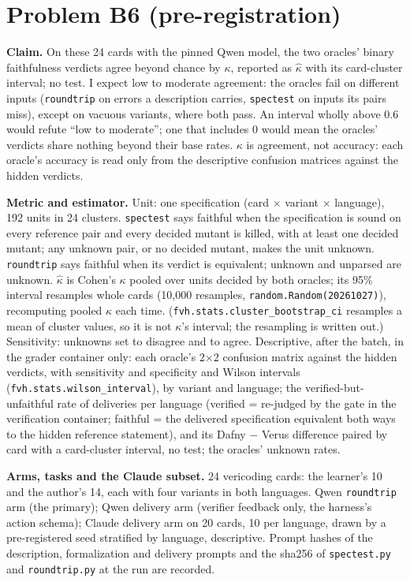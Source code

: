 \documentclass[11pt]{article}
\begin{document}
\section*{Problem B6 (pre-registration)}\label{ans:B6}
\begin{answer}
\textbf{Claim.} On these 24 cards with the pinned Qwen model, the two oracles'
binary faithfulness verdicts agree beyond chance by $\kappa$, reported as
$\hat\kappa$ with its card-cluster interval; no test. I expect low to moderate
agreement: the oracles fail on different inputs (\texttt{roundtrip} on errors a
description carries, \texttt{spectest} on inputs its pairs miss), except on
vacuous variants, where both pass. An interval wholly above 0.6 would refute
``low to moderate''; one that includes 0 would mean the oracles' verdicts
share nothing beyond their base rates. $\kappa$ is agreement, not accuracy:
each oracle's accuracy is read only from the descriptive confusion matrices
against the hidden verdicts.

\textbf{Metric and estimator.} Unit: one specification (card $\times$ variant
$\times$ language), 192 units in 24 clusters. \texttt{spectest} says faithful
when the specification is sound on every reference pair and every decided
mutant is killed, with at least one decided mutant; any unknown pair, or no
decided mutant, makes the unit unknown. \texttt{roundtrip} says faithful when
its verdict is equivalent; unknown and unparsed are unknown. $\hat\kappa$ is
Cohen's $\kappa$ pooled over units decided by both oracles; its 95\% interval
resamples whole cards (10,000 resamples, \texttt{random.Random(20261027)}),
recomputing pooled $\kappa$ each time. (\texttt{fvh.stats.cluster\_bootstrap\_ci}
resamples a mean of cluster values, so it is not $\kappa$'s interval; the
resampling is written out.) Sensitivity: unknowns set to disagree and to
agree. Descriptive, after the batch, in the grader container only: each
oracle's 2$\times$2 confusion matrix against the hidden verdicts, with
sensitivity and specificity and Wilson intervals (\texttt{fvh.stats.wilson\_interval}),
by variant and language; the verified-but-unfaithful rate of deliveries per
language (verified = re-judged by the gate in the verification container;
faithful = the delivered specification equivalent both ways to the hidden
reference statement), and its Dafny $-$ Verus difference paired by card with a
card-cluster interval, no test; the oracles' unknown rates.

\textbf{Arms, tasks and the Claude subset.} 24 vericoding cards: the
learner's 10 and the author's 14, each with four variants in both languages.
Qwen \texttt{roundtrip} arm (the primary); Qwen delivery arm (verifier feedback
only, the harness's action schema); Claude delivery arm on 20 cards, 10 per
language, drawn by a pre-registered seed stratified by language, descriptive.
Prompt hashes of the description, formalization and delivery prompts and the
sha256 of \texttt{spectest.py} and \texttt{roundtrip.py} at the run are
recorded.


\end{answer}
\end{document}
